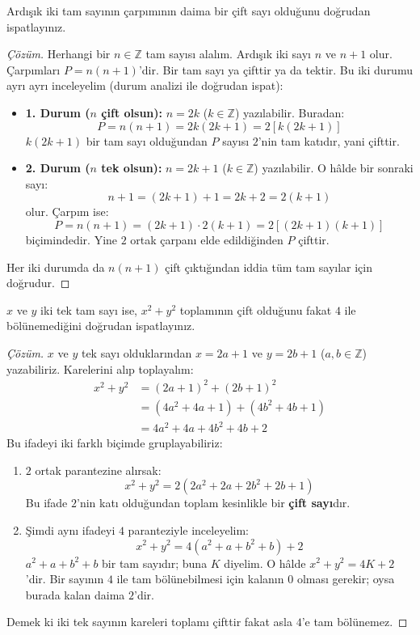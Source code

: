 \begin{example}
Ardışık iki tam sayının çarpımının daima bir çift sayı olduğunu doğrudan ispatlayınız.
\end{example}
\begin{proof}[Çözüm]
Herhangi bir $n \in \mathbb{Z}$ tam sayısı alalım. Ardışık iki sayı $n$ ve $n+1$ olur. Çarpımları $P = n(n+1)$'dir. Bir tam sayı ya çifttir ya da tektir. Bu iki durumu ayrı ayrı inceleyelim (durum analizi ile doğrudan ispat):
\begin{itemize}
  \item \textbf{1. Durum ($n$ çift olsun):} $n = 2k$ ($k \in \mathbb{Z}$) yazılabilir. Buradan:
  \[ P = n(n+1) = 2k(2k+1) = 2[k(2k+1)] \]
  $k(2k+1)$ bir tam sayı olduğundan $P$ sayısı $2$'nin tam katıdır, yani çifttir.
  \item \textbf{2. Durum ($n$ tek olsun):} $n = 2k+1$ ($k \in \mathbb{Z}$) yazılabilir. O hâlde bir sonraki sayı:
  \[ n+1 = (2k+1) + 1 = 2k+2 = 2(k+1) \]
  olur. Çarpım ise:
  \[ P = n(n+1) = (2k+1) \cdot 2(k+1) = 2[(2k+1)(k+1)] \]
  biçimindedir. Yine $2$ ortak çarpanı elde edildiğinden $P$ çifttir.
\end{itemize}
Her iki durumda da $n(n+1)$ çift çıktığından iddia tüm tam sayılar için doğrudur.
\end{proof}

\begin{example}
$x$ ve $y$ iki tek tam sayı ise, $x^2 + y^2$ toplamının çift olduğunu fakat $4$ ile bölünemediğini doğrudan ispatlayınız.
\end{example}
\begin{proof}[Çözüm]
$x$ ve $y$ tek sayı olduklarından $x = 2a + 1$ ve $y = 2b + 1$ ($a, b \in \mathbb{Z}$) yazabiliriz. Karelerini alıp toplayalım:
\begin{align*}
x^2 + y^2 &= (2a + 1)^2 + (2b + 1)^2 \\
&= (4a^2 + 4a + 1) + (4b^2 + 4b + 1) \\
&= 4a^2 + 4a + 4b^2 + 4b + 2
\end{align*}
Bu ifadeyi iki farklı biçimde gruplayabiliriz:
\begin{enumerate}
  \item $2$ ortak parantezine alırsak:
  \[ x^2 + y^2 = 2(2a^2 + 2a + 2b^2 + 2b + 1) \]
  Bu ifade $2$'nin katı olduğundan toplam kesinlikle bir \textbf{çift sayı}dır.
  \item Şimdi aynı ifadeyi $4$ paranteziyle inceleyelim:
  \[ x^2 + y^2 = 4(a^2 + a + b^2 + b) + 2 \]
  $a^2 + a + b^2 + b$ bir tam sayıdır; buna $K$ diyelim. O hâlde $x^2 + y^2 = 4K + 2$'dir. Bir sayının $4$ ile tam bölünebilmesi için kalanın $0$ olması gerekir; oysa burada kalan daima $2$'dir.
\end{enumerate}
Demek ki iki tek sayının kareleri toplamı çifttir fakat asla $4$'e tam bölünemez.
\end{proof}

